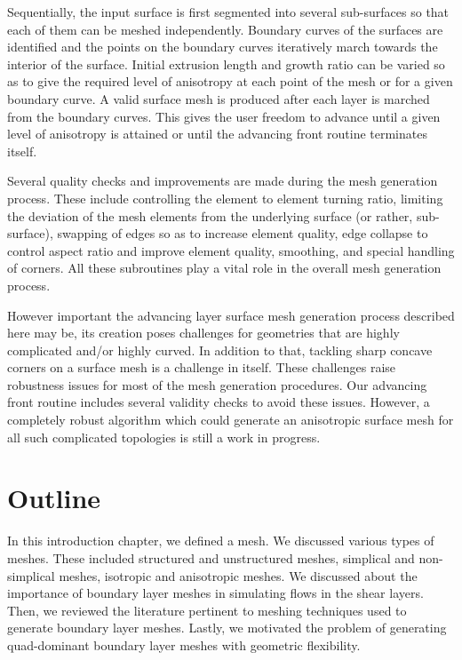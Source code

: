 Sequentially, the input surface is first segmented into several sub-surfaces so that each of them can be meshed independently. Boundary curves of the surfaces are identified and the points on the boundary curves iteratively march towards the interior of the surface. Initial extrusion length and growth ratio can be varied so as to give the required level of anisotropy at each point of the mesh or for a given boundary curve. A valid surface mesh is produced after each layer is marched from the boundary curves. This gives the user freedom to advance until a given level of anisotropy is attained or until the advancing front routine terminates itself. 

Several quality checks and improvements are made during the mesh generation process. These include controlling the element to element turning ratio, limiting the deviation of the mesh elements from the underlying surface (or rather, sub-surface), swapping of edges so as to increase element quality, edge collapse to control aspect ratio and improve element quality, smoothing, and special handling of corners. All these subroutines play a vital role in the overall mesh generation process.

However important the advancing layer surface mesh generation process described here may be, its creation poses challenges for geometries that are highly complicated and/or highly curved. In addition to that, tackling sharp concave corners on a surface mesh is a challenge in itself. These challenges raise robustness issues for most of the mesh generation procedures. Our advancing front routine includes several validity checks to avoid these issues. However, a completely robust algorithm which could generate an anisotropic surface mesh for all such complicated topologies is still a work in progress.

\section{Outline}

In this introduction chapter, we defined a mesh. We discussed various types of meshes. These included structured and unstructured meshes, simplical and non-simplical meshes, isotropic and anisotropic meshes. We discussed about the importance of boundary layer meshes in simulating flows in the shear layers. Then, we reviewed the literature pertinent to meshing techniques used to generate boundary layer meshes. Lastly, we motivated the problem of generating quad-dominant boundary layer meshes with geometric flexibility.

